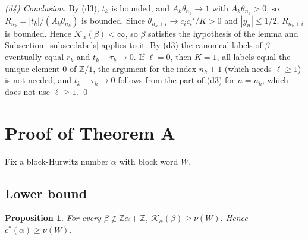 \documentclass[11pt]{amsart}
\newtheorem{proposition}[theorem]{Proposition}
\theoremstyle{definition}
\theoremstyle{remark}
\newcommand{\Z}{\mathbb{Z}}
\newcommand{\KL}{\mathcal{K}}
\begin{document}
\emph{(d4) Conclusion.} By (d3), $t_k$ is bounded, and $A_k\theta_{n_k}\to1$ with $A_k\theta_{n_k}>0$, so
$R_{n_k}=|t_k|/(A_k\theta_{n_k})$ is bounded. Since $\theta_{n_k+i}\to c_ic_i'/K>0$ and $|y_n|\le1/2$, $R_{n_k+i}$ is
bounded. Hence $\KL_\alpha(\beta)<\infty$, so $\beta$ satisfies the hypothesis of the lemma and
Subsection~\ref{subsec:labels} applies to it. By (d3) the canonical labels of $\beta$ eventually equal $r_k$ and
$t_k-\tau_k\to0$. If $\ell=0$, then $K=1$, all labels equal the unique element $0$ of $\Z/1$, the argument for the
index $n_k+1$ (which needs $\ell\ge1$) is not needed, and $t_k-\tau_k\to0$ follows from the part of (d3) for
$n=n_k$, which does not use $\ell\ge1$. \qed

\section{Proof of Theorem A}\label{sec:thmA}

Fix a block-Hurwitz number $\alpha$ with block word $W$.

\subsection{Lower bound}\label{subsec:lower}
\begin{proposition}\label{prop:lower}
For every $\beta\notin\Z\alpha+\Z$, $\KL_\alpha(\beta)\ge\nu(W)$. Hence $c^*(\alpha)\ge\nu(W)$.
\end{proposition}
\end{document}
